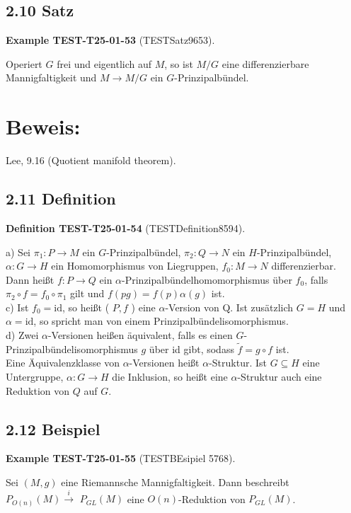 \documentclass[10pt, letterpaper]{article}
\newcommand{\CustomHeading}[3]{%
  \par\medskip\noindent%
  \textbf{#1 #2} \textnormal{(#3)}.\enskip%
}
\newenvironment{DEF}[2]{\begin{unitbox}\CustomHeading{Definition}{#1}{#2}}{\end{unitbox}}
\newenvironment{EXA}[2]{\begin{unitbox}\CustomHeading{Example}{#1}{#2}}{\end{unitbox}}
\begin{document}
\subsection*{2.10 Satz}
\begin{EXA}{TEST-T25-01-53}{TESTSatz9653}
Operiert $G$ frei und eigentlich auf $M$, so ist $M / G$ eine differenzierbare Mannigfaltigkeit und $M \rightarrow M / G$ ein $G$-Prinzipalbündel.
\end{EXA}

\section*{Beweis:}
Lee, 9.16 (Quotient manifold theorem).

\subsection*{2.11 Definition}
\begin{DEF}{TEST-T25-01-54}{TESTDefinition8594}
a) Sei $\pi_{1}: P \rightarrow M$ ein $G$-Prinzipalbündel, $\pi_{2}: Q \rightarrow N$ ein $H$-Prinzipalbündel, $\alpha: G \rightarrow H$ ein Homomorphismus von Liegruppen, $f_{0}: M \rightarrow N$ differenzierbar. Dann heißt $f: P \rightarrow Q$ ein $\alpha$-Prinzipalbündelhomomorphismus über $f_{0}$, falls $\pi_{2} \circ f=f_{0} \circ \pi_{1}$ gilt und $f(p g)=f(p) \alpha(g)$ ist.\\
c) Ist $f_{0}=\mathrm{id}$, so heißt ( $P, f$ ) eine $\alpha$-Version von Q. Ist zusätzlich $G=H$ und $\alpha=\mathrm{id}$, so spricht man von einem Prinzipalbündelisomorphismus.\\
d) Zwei $\alpha$-Versionen heißen äquivalent, falls es einen $G$-Prinzipalbündelisomorphismus $g$ über id gibt, sodass $\tilde{f}=g \circ f$ ist.\\
Eine Äquivalenzklasse von $\alpha$-Versionen heißt $\alpha$-Struktur. Ist $G \subseteq H$ eine Untergruppe, $\alpha: G \rightarrow H$ die Inklusion, so heißt eine $\alpha$-Struktur auch eine Reduktion von $Q$ auf $G$.
\end{DEF}

\subsection*{2.12 Beispiel}
\begin{EXA}{TEST-T25-01-55}{TESTBEsipiel 5768}
Sei $(M, g)$ eine Riemannsche Mannigfaltigkeit. Dann beschreibt $P_{O(n)}(M) \xrightarrow{i}$ $P_{G L}(M)$ eine $O(n)$-Reduktion von $P_{G L}(M)$.
\end{EXA}
\end{document}
